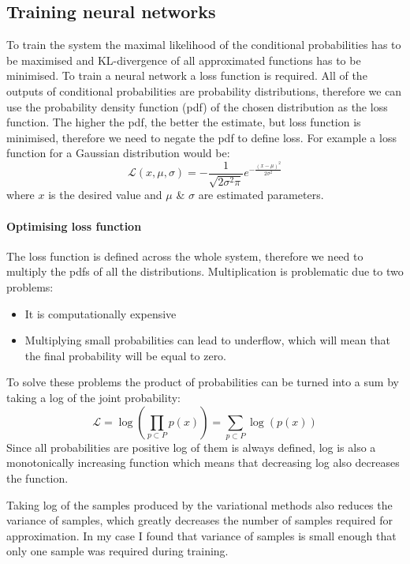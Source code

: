 \documentclass[12pt,a4paper]{book}
\begin{document}
\subsection{Training neural networks}
To train the system the maximal likelihood of the conditional probabilities has to be maximised and KL-divergence of all approximated functions has to be minimised.
To train a neural network a loss function is required.
All of the outputs of conditional probabilities are probability distributions, therefore we can use the probability density function (pdf) of the chosen distribution as the loss function.
The higher the pdf, the better the estimate, but loss function is minimised, therefore we need to negate the pdf to define loss.
For example a loss function for a Gaussian distribution would be:
\begin{equation}
\mathcal{L}(x,\mu,\sigma) = -\frac{1}{\sqrt{2\sigma^2\pi}}e^{-\frac{(x-\mu)^2}{2\sigma^2}}
\label{eq:gaussian-loss}
\end{equation}
where $x$ is the desired value and $\mu$ \& $\sigma$ are estimated parameters.

\paragraph{Optimising loss function}
The loss function is defined across the whole system, therefore we need to multiply the pdfs of all the distributions.
Multiplication is problematic due to two problems:
\begin{itemize}
\item It is computationally expensive
\item Multiplying small probabilities can lead to underflow, which will mean that the final probability will be equal to zero.
\end{itemize}
To solve these problems the product of probabilities can be turned into a sum by taking a log of the joint probability:
\begin{equation}
\mathcal{L} = \log\left(\prod_{p\subset P}p(x)\right) = \sum_{p\subset P}\log(p(x))
\end{equation}
Since all probabilities are positive log of them is always defined, log is also a monotonically increasing function which means that decreasing log also decreases the function.

Taking log of the samples produced by the variational methods also reduces the variance of samples, which greatly decreases the number of samples required for approximation.
In my case I found that variance of samples is small enough that only one sample was required during training.
\end{document}
